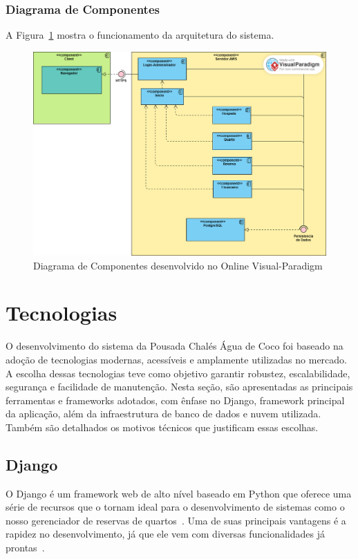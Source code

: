 \documentclass[
	12pt,				%
	openany,			%
	oneside,			%
	a4paper,			%
	english,			%
	french,				%
	spanish,			%
	brazil				%
	]{abntex2}
\begin{document}
\subsubsection{Diagrama de Componentes}
A Figura~\ref{fig:diagramacomponentes} mostra o funcionamento da arquitetura do sistema.

\begin{figure}[h!]
	\centering
	\includegraphics[width=\textwidth]{0406-Componentes.png}
	\caption{Diagrama de Componentes desenvolvido no Online Visual-Paradigm}
	\label{fig:diagramacomponentes}
\end{figure}


\section{Tecnologias}
O desenvolvimento do sistema da Pousada Chalés Água de Coco foi baseado na adoção de tecnologias modernas, acessíveis e amplamente utilizadas no mercado. A escolha dessas tecnologias teve como objetivo garantir robustez, escalabilidade, segurança e facilidade de manutenção. Nesta seção, são apresentadas as principais ferramentas e frameworks adotados, com ênfase no Django, framework principal da aplicação, além da infraestrutura de banco de dados e nuvem utilizada. Também são detalhados os motivos técnicos que justificam essas escolhas.
\subsection{Django}

O Django é um framework web de alto nível baseado em Python que oferece uma série de recursos que o tornam ideal para o desenvolvimento de sistemas como o nosso gerenciador de reservas de quartos~\cite{python}. Uma de suas principais vantagens é a rapidez no desenvolvimento, já que ele vem com diversas funcionalidades já prontas~\cite{django}.
\end{document}
